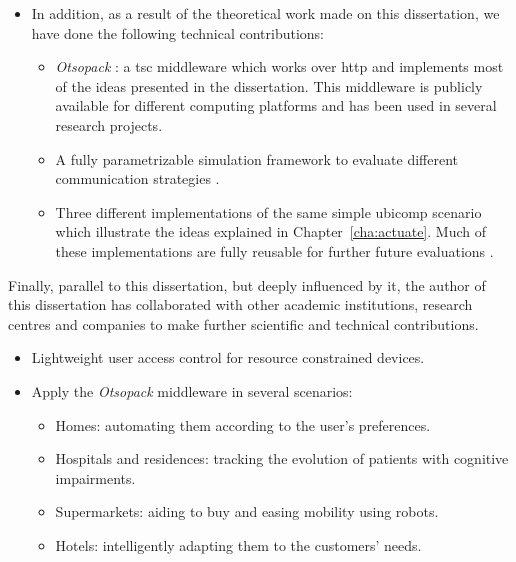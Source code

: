 \begin{itemize}
  \item In addition, as a result of the theoretical work made on this dissertation, we have done the following technical contributions:
    \begin{itemize}
      \item \emph{Otsopack} : a \ac{tsc} middleware which works over \ac{http} and implements most of the ideas presented in the dissertation.
            This middleware is publicly available for different computing platforms and has been used in several research projects.
      \item A fully parametrizable simulation framework to evaluate different communication strategies .
      \item Three different implementations of the same simple \ac{ubicomp} scenario which illustrate the ideas explained in Chapter~\ref{cha:actuate}.
	    Much of these implementations are fully reusable for further future evaluations .
    \end{itemize}
\end{itemize}


Finally, parallel to this dissertation, but deeply influenced by it, the author of this dissertation has collaborated with other academic institutions, research centres and companies to make further scientific and technical contributions.
\begin{itemize}
  \item Lightweight user access control for resource constrained devices. %
  \item Apply the \emph{Otsopack} middleware in several scenarios:
    \begin{itemize}
      \item Homes: automating them according to the user's preferences. %
      \item Hospitals and residences: tracking the evolution of patients with cognitive impairments.  %
      \item Supermarkets: aiding to buy and easing mobility using robots.
      \item Hotels: intelligently adapting them to the customers' needs.
    \end{itemize}
\end{itemize}